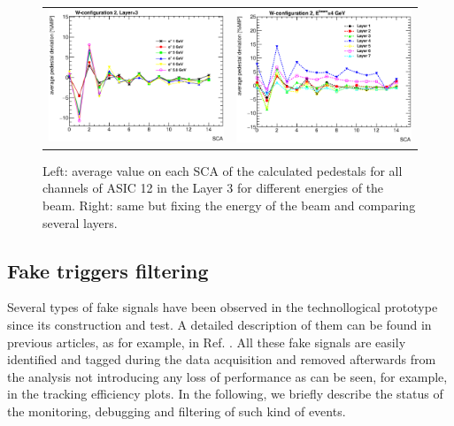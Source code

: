 \documentclass[a4paper,11pt]{article}
\begin{document}
\begin{figure}[!t]
  \centering 
    \begin{tabular}{ll}
      \includegraphics[width=2.8in]{figs/pedestal/pedestal_deviation_layer3.eps} & \includegraphics[width=2.8in]{figs/pedestal/pedestal_deviation_4GeV.eps} \\
    \end{tabular}
    \caption{Left: average value on each SCA of the calculated pedestals for all channels of ASIC 12 in the Layer 3 for different energies of the beam. Right: same but fixing the energy of the beam and comparing several layers.}
\label{pedestal_shower_2}
\end{figure}








\subsection{Fake triggers filtering}
\label{sec:retriggers}

Several types of fake signals have been observed in the technollogical prototype since its construction and test. A detailed description of them
can be found in previous articles, as for example, in Ref. \cite{Amjad:2014tha}. All these fake signals are easily identified
and tagged during the data acquisition and removed afterwards from the analysis
not introducing any loss of performance as can be seen, for example, in the tracking efficiency plots.
In the following, we briefly describe the status of the monitoring, debugging and filtering
of such kind of events.
\end{document}
